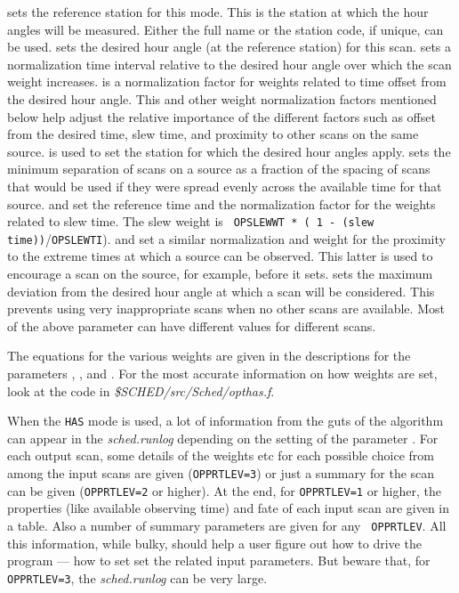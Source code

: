 \documentclass{report}
\begin{document}
\begin{description}
 sets the reference station for
this mode.  This is the station at which the hour angles will be
measured.  Either the full name or the station code, if unique, can be
used.   sets the desired hour angle (at
the reference station) for this scan.   sets a normalization time interval relative to
the desired hour angle over which the scan weight increases.
 is a normalization factor for
weights related to time offset from the desired hour angle.  This and
other weight normalization factors mentioned below help adjust the
relative importance of the different factors such as offset from the
desired time, slew time, and proximity to other scans on the same
source.   is used to set the
station for which the desired hour angles apply.   sets the minimum separation of scans on a
source as a fraction of the spacing of scans that would be used if
they were spread evenly across the available time for that source.
 and  set the reference time and the normalization
factor for the weights related to slew time.  The slew weight is {\tt
OPSLEWWT * ( 1 - (slew time))}/{\tt OPSLEWTI}).
 and
 set a similar normalization and
weight for the proximity to the extreme times at which a source can be
observed.  This latter is used to encourage a scan on the source, for
example, before it sets.   sets
the maximum deviation from the desired hour angle at which a scan will
be considered.  This prevents using very inappropriate scans when no
other scans are available.  Most of the above parameter can have
different values for different scans.

The equations for the various weights are given in the descriptions
for the parameters , , and .  For
the most accurate information on how weights are set, look at the code
in {\sl \$SCHED/src/Sched/opthas.f}.

When the {\tt HAS} mode is used, a lot of information from the guts of
the algorithm can appear in the {\sl sched.runlog} depending on the
setting of the parameter .  For
each output scan, some details of the weights etc for each possible
choice from among the input scans are given ({\tt OPPRTLEV=3}) or just
a summary for the scan can be given ({\tt OPPRTLEV=2} or higher).  At
the end, for {\tt OPPRTLEV=1} or higher, the properties (like
available observing time) and fate of each input scan are given in a
table.  Also a number of summary parameters are given for any {\tt
OPPRTLEV}.  All this information, while bulky, should help a user
figure out how to drive the program --- how to set set the related
input parameters.  But beware that, for {\tt OPPRTLEV=3}, the {\sl
sched.runlog} can be very large.


\end{description}
\end{document}
